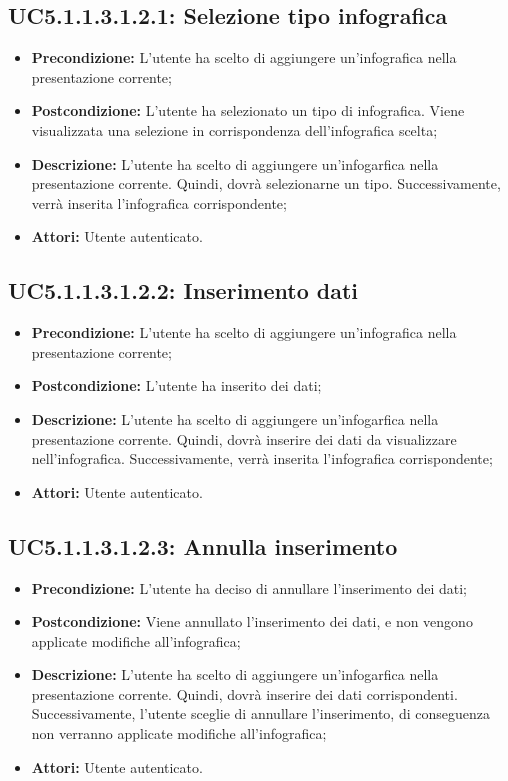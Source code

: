 \subsection{ UC5.1.1.3.1.2.1: Selezione tipo infografica}

\begin{itemize}
	\item \textbf{Precondizione:} L'utente ha scelto di aggiungere un'infografica nella presentazione corrente;
	\item \textbf{Postcondizione:} L'utente ha selezionato un tipo di infografica. Viene visualizzata una selezione in corrispondenza dell'infografica scelta;
	\item \textbf{Descrizione:} L'utente ha scelto di aggiungere un'infogarfica nella presentazione corrente. Quindi, dovrà selezionarne un tipo. Successivamente, verrà inserita l'infografica corrispondente;
	\item \textbf{Attori:} Utente autenticato.
\end{itemize}
\subsection{ UC5.1.1.3.1.2.2: Inserimento dati}

\begin{itemize}
	\item \textbf{Precondizione:} L'utente ha scelto di aggiungere un'infografica nella presentazione corrente;
	\item \textbf{Postcondizione:} L'utente ha inserito dei dati;
	\item \textbf{Descrizione:} L'utente ha scelto di aggiungere un'infogarfica nella presentazione corrente. Quindi, dovrà inserire dei dati da visualizzare nell'infografica. Successivamente, verrà inserita l'infografica corrispondente;
	\item \textbf{Attori:} Utente autenticato.
\end{itemize}
\subsection{ UC5.1.1.3.1.2.3: Annulla inserimento}

\begin{itemize}
	\item \textbf{Precondizione:} L'utente ha deciso di annullare l'inserimento dei dati;
	\item \textbf{Postcondizione:} Viene annullato l'inserimento dei dati, e non vengono applicate modifiche all'infografica;
	\item \textbf{Descrizione:} L'utente ha scelto di aggiungere un'infogarfica nella presentazione corrente. Quindi, dovrà inserire dei dati corrispondenti. Successivamente, l'utente sceglie di annullare l'inserimento, di conseguenza non verranno applicate modifiche all'infografica;
	\item \textbf{Attori:} Utente autenticato.
\end{itemize}
